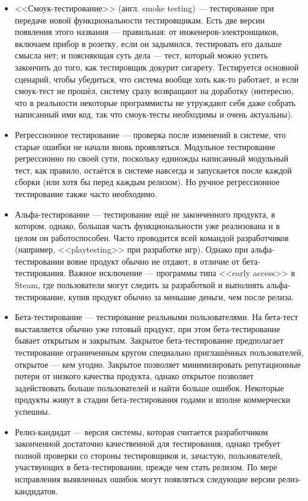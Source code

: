 \documentclass{../../text-style}
\begin{document}
\begin{itemize}
    \item <<Смоук-тестирование>> (англ. smoke testing) --- тестирование при передаче новой функциональности тестировщикам. Есть две версии появления этого названия --- правильная: от инженеров-электронщиков, включаем прибор в розетку, если он задымился, тестировать его дальше смысла нет; и поясняющая суть дела --- тест, который можно успеть закончить до того, как тестировщик докурит сигарету. Тестируется основной сценарий, чтобы убедиться, что система вообще хоть как-то работает, и если смоук-тест не прошёл, систему сразу возвращают на доработку (интересно, что в реальности некоторые программисты не утруждают себя даже собрать написанный ими код, так что смоук-тесты необходимы и очень актуальны).
    \item Регрессионное тестирование --- проверка после изменений в системе, что старые ошибки не начали вновь проявляться. Модульное тестирование регрессионно по своей сути, поскольку единожды написанный модульный тест, как правило, остаётся в системе навсегда и запускается после каждой сборки (или хотя бы перед каждым релизом). Но ручное регрессионное тестирование также часто необходимо.
    \item Альфа-тестирование --- тестирование ещё не законченного продукта, в котором, однако, большая часть функциональности уже реализована и в целом он работоспособен. Часто проводится всей командой разработчиков (например, <<playtesting>> при разработке игр). Однако при альфа-тестировании вовне продукт обычно не отдают, в отличие от бета-тестирования. Важное исключение --- программы типа <<early access>> в Steam, где пользователи могут следить за разработкой и выполнять альфа-тестирование, купив продукт обычно за меньшие деньги, чем после релиза.
    \item Бета-тестирование --- тестирование реальными пользователями. На бета-тест выставляется обычно уже готовый продукт, при этом бета-тестирование бывает открытым и закрытым. Закрытое бета-тестирование предполагает тестирование ограниченным кругом специально приглашённых пользователей, открытое --- кем угодно. Закрытое позволяет минимизировать репутационные потери от низкого качества продукта, однако открытое позволяет задействовать больше пользователей и найти больше ошибок. Некоторые продукты живут в стадии бета-тестирования годами и вполне коммерчески успешны.
    \item Релиз-кандидат --- версия системы, которая считается разработчиком законченной достаточно качественной для тестирования, однако требует полной проверки со стороны тестировщиков и, зачастую, пользователей, участвующих в бета-тестировании, прежде чем стать релизом. По мере исправления выявленных ошибок могут появляться следующие версии релиз-кандидатов.
\end{itemize}
\end{document}
